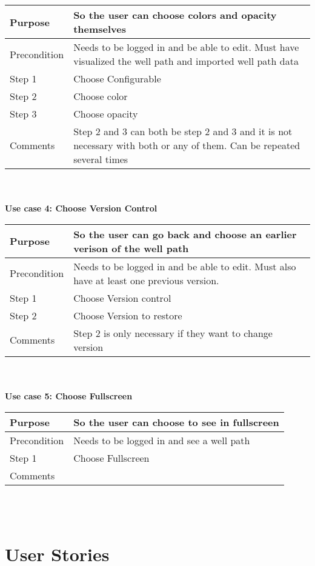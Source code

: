 \documentclass{report}
\begin{document}
\begin{tabular}{| p{2 cm} | p{9 cm}|} \hline
Purpose & So the user can choose colors and opacity themselves \\ \hline
Precondition & Needs to be logged in and be able to edit. Must have visualized the well path and imported well path data  \\ \hline %
Step 1 & Choose Configurable \\ \hline
Step 2 & Choose color \\ \hline
Step 3 & Choose opacity \\ \hline
Comments & Step 2 and 3 can both be step 2 and 3 and it is not necessary with both or any of them. Can be repeated several times \\ \hline %
\end{tabular}\\\\
\textbf{Use case 4: Choose Version Control}\\
\begin{tabular}{| p{2 cm} | p{9 cm}|} \hline
Purpose & So the user can go back and choose an earlier verison of the well path \\ \hline
Precondition & Needs to be logged in and be able to edit. Must also have at least one previous version. \\ \hline 
Step 1 & Choose Version control \\ \hline
Step 2 & Choose Version to restore \\ \hline
Comments & Step 2 is only necessary if they want to change version \\ \hline 
\end{tabular}\\\\
\textbf{Use case 5: Choose Fullscreen}\\
\begin{tabular}{| p{2 cm} | p{9 cm}|} \hline
Purpose & So the user can choose to see in fullscreen \\ \hline
Precondition & Needs to be logged in and see a well path \\ \hline 
Step 1 & Choose Fullscreen \\ \hline
Comments &   \\ \hline 
\end{tabular}\\\\

\newpage%
\section{User Stories} \label{sec:user_stories} %
\end{document}
